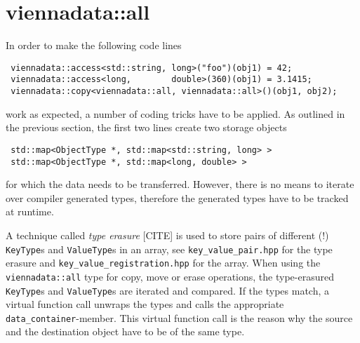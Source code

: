 \section{viennadata::all} \label{sec:viennadata-all}
In order to make the following code lines
\begin{lstlisting}
 viennadata::access<std::string, long>("foo")(obj1) = 42;
 viennadata::access<long,        double>(360)(obj1) = 3.1415;
 viennadata::copy<viennadata::all, viennadata::all>()(obj1, obj2);
\end{lstlisting}
work as expected, a number of coding tricks have to be applied. As outlined in the previous section, the first two lines create two storage objects
\begin{lstlisting}
 std::map<ObjectType *, std::map<std::string, long> >
 std::map<ObjectType *, std::map<long, double> >
\end{lstlisting}
for which the data needs to be transferred. However, there is no means to iterate over compiler generated types, therefore the generated types have to be tracked at runtime.

A technique called \emph{type erasure} [CITE] is used to store pairs of different (!) \lstinline|KeyType|s and \lstinline|ValueType|s in an array, see \lstinline|key_value_pair.hpp| for the type erasure and \lstinline|key_value_registration.hpp| for the array. When using the \lstinline|viennadata::all| type for copy, move or erase operations, the type-erasured \lstinline|KeyType|s and \lstinline|ValueType|s are iterated and compared. If the types match, a virtual function call unwraps the types and calls the appropriate \lstinline|data_container|-member. This virtual function call is the reason why the source and the destination object have to be of the same type.

